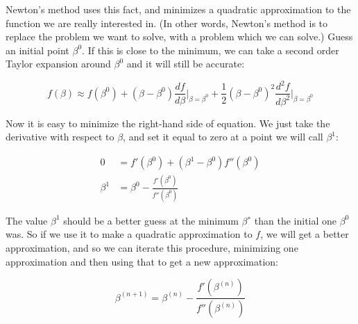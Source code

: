 \documentclass{article}
\begin{document}
Newton's method uses this fact, and minimizes a quadratic approximation to the function we are really interested in. (In other words, Newton's method is to replace the problem we want to solve, with a problem which we can solve.) Guess an initial point $\beta^0$. If this is close to the minimum, we can take a second order Taylor expansion around $\beta^0$ and it will still be accurate:

\[
f(\beta) \approx f(\beta^0) + (\beta - \beta^0) \frac{df}{d\beta} \Bigr|_{\beta = \beta^0} + \frac{1}{2} (\beta - \beta^0)^2 \frac{d^2f}{d\beta^2} \Bigr|_{\beta = \beta^0}
\]

Now it is easy to minimize the right-hand side of equation. We just take the derivative with respect to $\beta$, and set it equal to zero at a point we will call $\beta^1$:

\begin{align*}
0 & = f'(\beta^0) + (\beta^1 - \beta^0)f''(\beta^0) \\
\beta^1 & = \beta^0 - \frac{f'(\beta^0)}{f''(\beta^0)}
\end{align*}

The value $\beta^1$ should be a better guess at the minimum $\beta^∗$ than the initial one $\beta^0$ was. So if we use it to make a quadratic approximation to $f$, we will get a better approximation, and so we can iterate this procedure, minimizing one approximation and then using that to get a new approximation:

\[
\beta^{(n+1)} = \beta^{(n)} - \frac{f'(\beta^{(n)})}{f''(\beta^{(n)})}
\]
\end{document}
